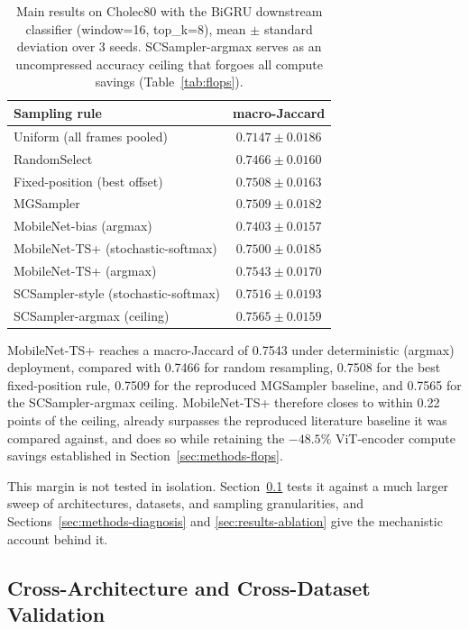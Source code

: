 \documentclass[preprint,12pt]{elsarticle}
\begin{document}
\begin{table}[t]
\centering
\caption{Main results on Cholec80 with the BiGRU downstream classifier (window=16, top\_k=8), mean $\pm$ standard deviation over 3 seeds. SCSampler-argmax serves as an uncompressed accuracy ceiling that forgoes all compute savings (Table~\ref{tab:flops}).}
\label{tab:main}
\begin{tabular}{lc}
\toprule
Sampling rule & macro-Jaccard \\
\midrule
Uniform (all frames pooled) & $0.7147 \pm 0.0186$ \\
RandomSelect & $0.7466 \pm 0.0160$ \\
Fixed-position (best offset) & $0.7508 \pm 0.0163$ \\
MGSampler & $0.7509 \pm 0.0182$ \\
MobileNet-bias (argmax) & $0.7403 \pm 0.0157$ \\
MobileNet-TS+ (stochastic-softmax) & $0.7500 \pm 0.0185$ \\
MobileNet-TS+ (argmax) & $\mathbf{0.7543 \pm 0.0170}$ \\
SCSampler-style (stochastic-softmax) & $0.7516 \pm 0.0193$ \\
SCSampler-argmax (ceiling) & $0.7565 \pm 0.0159$ \\
\bottomrule
\end{tabular}
\end{table}

MobileNet-TS+ reaches a macro-Jaccard of 0.7543 under deterministic (argmax) deployment, compared with 0.7466 for random resampling, 0.7508 for the best fixed-position rule, 0.7509 for the reproduced MGSampler baseline, and 0.7565 for the SCSampler-argmax ceiling. MobileNet-TS+ therefore closes to within 0.22 points of the ceiling, already surpasses the reproduced literature baseline it was compared against, and does so while retaining the $-48.5\%$ ViT-encoder compute savings established in Section~\ref{sec:methods-flops}.

This margin is not tested in isolation. Section~\ref{sec:results-arch} tests it against a much larger sweep of architectures, datasets, and sampling granularities, and Sections~\ref{sec:methods-diagnosis} and \ref{sec:results-ablation} give the mechanistic account behind it.

\subsection{Cross-Architecture and Cross-Dataset Validation}
\label{sec:results-arch}
\end{document}
